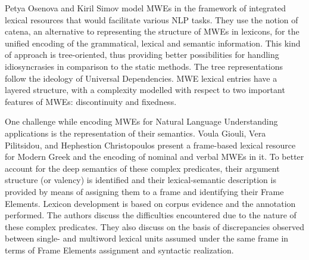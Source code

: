 \begin{refsection}
Petya Osenova and Kiril Simov model MWEs in the framework of integrated lexical resources that would facilitate various NLP tasks. They use the notion of catena, an alternative to representing the structure of MWEs in lexicons, %
for the unified encoding of the grammatical, lexical and semantic information. This kind of approach is tree-oriented, thus providing better possibilities for handling idiosyncrasies in comparison to the static methods. The tree representations follow the ideology of Universal Dependencies. MWE lexical entries have a layered structure, with a complexity modelled with respect to two important features of MWEs: discontinuity and fixedness.

One challenge while encoding MWEs for Natural Language Understanding applications is the representation of their semantics. 
Voula Giouli, Vera Pilitsidou, and Hephestion Christopoulos present a frame-based lexical resource for Modern Greek and the encoding of nominal and verbal MWEs in it. To better account for the deep semantics of these complex predicates, their argument structure (or valency) is identified and their lexical-semantic description is provided by means of assigning them to a frame and identifying their Frame Elements. Lexicon development is based on corpus evidence and the annotation performed. The authors discuss the difficulties encountered due to the nature of these complex predicates. They also discuss on the basis of discrepancies observed between single- and multiword lexical units assumed under the same frame in terms of Frame Elements assignment and syntactic realization. 
 

\end{refsection}
